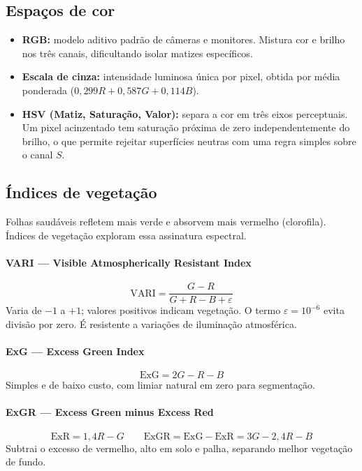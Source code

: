 \documentclass[12pt,a4paper]{article}
\begin{document}
\subsection{Espaços de cor}
\begin{itemize}
  \item \textbf{RGB:} modelo aditivo padrão de câmeras e monitores. Mistura cor e brilho nos
        três canais, dificultando isolar matizes específicos.
  \item \textbf{Escala de cinza:} intensidade luminosa única por pixel, obtida por média
        ponderada ($0{,}299R + 0{,}587G + 0{,}114B$).
  \item \textbf{HSV (Matiz, Saturação, Valor):} separa a cor em três eixos perceptuais. Um
        pixel acinzentado tem saturação próxima de zero independentemente do brilho, o que
        permite rejeitar superfícies neutras com uma regra simples sobre o canal $S$.
\end{itemize}

\subsection{Índices de vegetação}
Folhas saudáveis refletem mais verde e absorvem mais vermelho (clorofila). Índices de vegetação
exploram essa assinatura espectral.

\paragraph{VARI --- Visible Atmospherically Resistant Index} \cite{gitelson2002}
\begin{equation}
\text{VARI} = \frac{G - R}{G + R - B + \varepsilon}
\end{equation}
Varia de $-1$ a $+1$; valores positivos indicam vegetação. O termo $\varepsilon = 10^{-6}$
evita divisão por zero. É resistente a variações de iluminação atmosférica.

\paragraph{ExG --- Excess Green Index} \cite{woebbecke1995}
\begin{equation}
\text{ExG} = 2G - R - B
\end{equation}
Simples e de baixo custo, com limiar natural em zero para segmentação.

\paragraph{ExGR --- Excess Green minus Excess Red} \cite{meyer2008}
\begin{equation}
\text{ExR} = 1{,}4R - G \qquad \text{ExGR} = \text{ExG} - \text{ExR} = 3G - 2{,}4R - B
\end{equation}
Subtrai o excesso de vermelho, alto em solo e palha, separando melhor vegetação de fundo.
\end{document}
